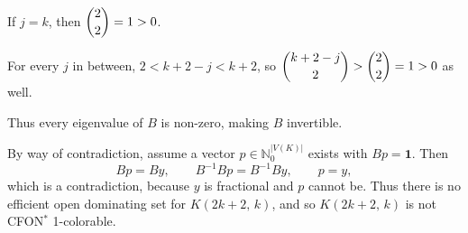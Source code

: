 \documentclass[11pt]{article}
\begin{document}
If $j = k$, then $\dbinom{2}{2} = 1 > 0$.

For every $j$ in between, $2 < k+2-j < k+2$, so
$\dbinom{k+2-j}{2} > \dbinom{2}{2} = 1 > 0$ as well.

Thus every eigenvalue of $B$ is non-zero, making $B$ invertible.

By way of contradiction, assume a vector $p \in \mathbb{N}_0^{|V(K)|}$ exists
with $Bp = \mathbf{1}$. Then
\[
  Bp = By, \qquad B^{-1}Bp = B^{-1}By, \qquad p = y,
\]
which is a contradiction, because $y$ is fractional and $p$ cannot be. Thus
there is no efficient open dominating set for $K(2k+2,\,k)$, and so
$K(2k+2,\,k)$ is not CFON$^{*}$ 1-colorable.
\end{document}
